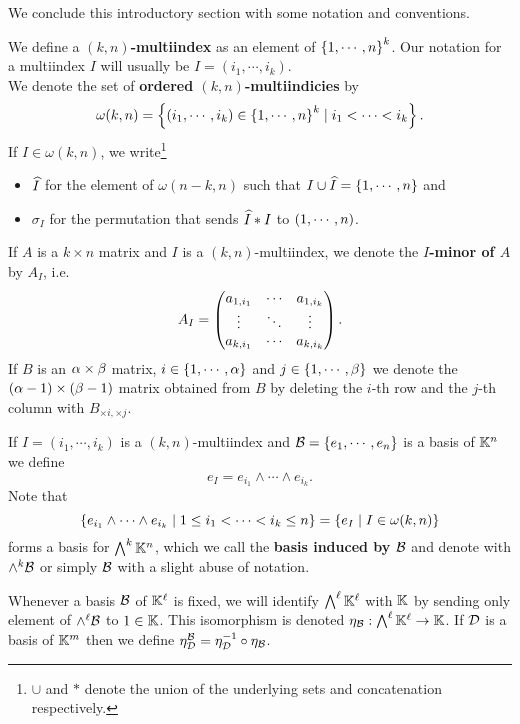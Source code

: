 \noindent We conclude this introductory section with some notation and conventions.
\begin{definition}[Multiindicies]
We define a \textbf{$(k,n)$-multiindex} as an element of $\left\{{1,\cdots, n}\right\}^k$. Our notation for a multiindex $I$ will usually be $I=(i_1,\cdots, i_k)$.\\
We denote the set of \textbf{ordered $(k,n)$-multiindicies} by
\[\omega(k,n)=\left\{{(i_1,\cdots, i_k)\in \left\{{1,\cdots, n}\right\}^k\mid i_1<\cdots<i_k}\right\}.\]
If $I\in \omega(k,n)$, we write\footnote{$\cup$ and $\ast$ denote the union of the underlying sets and concatenation respectively.}
\begin{itemize}
\item $\widehat{I}$ for the element of $\omega(n-k,n)$ such that $I\cup \widehat{I}=\left\{{1,\cdots, n}\right\}$ and 
\item $\sigma_I$ for the permutation that sends $\widehat{I}\ast I$ to $\left({1,\cdots, n}\right)$.
\end{itemize}
If $A$ is a $k\times n$ matrix and $I$ is a $(k,n)$-multiindex, we denote the \textbf{$I$-minor of $A$} by $A_I$, i.e.
\[A_I=\begin{pmatrix}a_{1,i_1} &\cdots &a_{1,i_{k}}\\\vdots &\ddots &\vdots\\a_{k,i_1}&\cdots&a_{k,i_k}\end{pmatrix}.\]
If $B$ is an $\alpha\times \beta$ matrix, $i\in\left\{{1,\cdots, \alpha}\right\}$ and $j\in \left\{{1,\cdots, \beta}\right\}$ we denote the $(\alpha-1)\times (\beta-1)$ matrix obtained from $B$ by deleting the $i$-th row and the $j$-th column with $B_{\times i,\times j}$.
\end{definition}

\begin{remark}
If $I=(i_1,\cdots, i_k)$ is a $(k,n)$-multiindex and $\mathcal{B}=\left\{{e_1,\cdots,e_n}\right\}$ is a basis of $\mathbb{K}^n$ we define
\[e_I=e_{i_1}\wedge\cdots\wedge e_{i_k}.\]
Note that
\[\left\{{e_{i_1}\wedge\cdots\wedge e_{i_k}\mid 1\leq i_1<\cdots<i_k\leq n}\right\}=\left\{{e_I\mid I\in \omega(k,n)}\right\}\]
forms a basis for $\bigwedge^k\mathbb{K}^n$, which we call the \textbf{basis induced by $\mathcal{B}$} and denote with $\wedge^k\mathcal{B}$ or simply $\mathcal{B}$ with a slight abuse of notation.
\end{remark}

\begin{notation}
Whenever a basis $\mathcal{B}$ of $\mathbb{K}^\ell$ is fixed, we will identify $\bigwedge^\ell\mathbb{K}^\ell$ with $\mathbb{K}$ by sending only element of $\wedge^\ell\mathcal{B}$ to $1\in\mathbb{K}$. This isomorphism is denoted $\eta_{\mathcal{B}}:\bigwedge^\ell\mathbb{K}^\ell\to \mathbb{K}$. If $\mathcal{D}$ is a basis of $\mathbb{K}^m$ then we define $\eta^{\mathcal{B}}_{\mathcal{D}}=\eta_{\mathcal{D}}^{-1}\circ \eta_{\mathcal{B}}$.
\end{notation}

